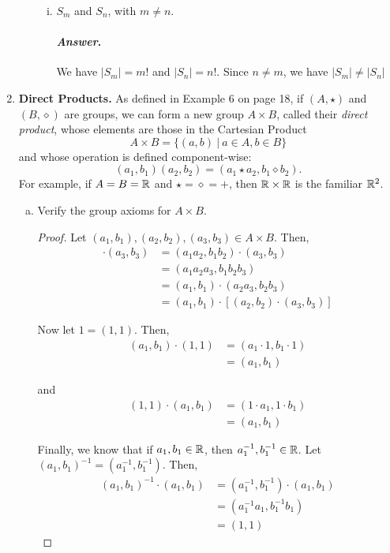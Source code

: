 \documentclass[11pt, reqno]{amsart}
\theoremstyle{plain}
\theoremstyle{definition}
\theoremstyle{example}
\newenvironment{ans}{\color{black}\medskip \paragraph*{\emph{Answer}.}}{\hfill \break  $~\!\!$ \dotfill \medskip }
\begin{document}
\begin{enumerate}[1.]
\begin{enumerate}[(a)]
\begin{enumerate}[(i)]
\item $S_m$ and $S_n$, with $m \neq n$.
\begin{ans}
We have $|S_m| = m!$ and $|S_n| = n!$. Since $n \neq m$, we have $|S_m| \neq |S_n|$
\end{ans}
\end{enumerate}

\end{enumerate}




\item {\bf Direct Products. } As defined in Example 6 on page 18, if $(A, \star)$ and $(B, \diamond)$ are groups, we can form a new group $A \times B$, called their \emph{direct product}, whose elements are those in the Cartesian Product 
$$A \times B = \{(a,b) ~|~ a \in A, b\in B\}$$
and whose operation is defined component-wise:
$$(a_1, b_1) (a_2, b_2) = (a_1 \star a_2, b_1 \diamond b_2).$$
For example, if $A = B = \mathbb{R}$ and $\star = \diamond = +$, then $\mathbb{R} \times \mathbb{R}$ is the familiar $\mathbb{R}^2$. 
\begin{enumerate}[(a)]
\item Verify the group axioms for $A \times B$. 
\begin{proof}
Let $(a_1, b_1), (a_2, b_2), (a_3, b_3) \in A \times B$. Then,
\begin{align*}
[(a_1, b_1) \cdot (a_2, b_2)] \cdot (a_3, b_3) &= (a_1a_2, b_1b_2) \cdot (a_3, b_3)\\
&= (a_1a_2a_3, b_1b_2b_3)\\
&= (a_1, b_1) \cdot (a_2a_3, b_2b_3)\\
&= (a_1, b_1) \cdot [(a_2, b_2) \cdot (a_3, b_3)]
\end{align*}

Now let $1 = (1, 1)$. Then,
\begin{align*}
(a_1, b_1) \cdot (1, 1) &= (a_1 \cdot 1, b_1 \cdot 1)\\
&= (a_1, b_1)
\end{align*}

and
\begin{align*}
(1, 1) \cdot (a_1, b_1) &= (1 \cdot a_1, 1 \cdot b_1)\\
&= (a_1, b_1)
\end{align*}

Finally, we know that if $a_1, b_1 \in \mathbb{R}$, then $a_1^{-1}, b_1^{-1} \in \mathbb{R}$. Let $(a_1, b_1)^{-1} = (a_1^{-1}, b_1^{-1})$. Then,
\begin{align*}
(a_1, b_1)^{-1} \cdot (a_1, b_1) &= (a_1^{-1}, b_1^{-1}) \cdot (a_1, b_1)\\
&= (a_1^{-1}a_1, b_1^{-1}b_1)\\
&= (1, 1)
\end{align*}


\end{proof}
\end{enumerate}
\end{enumerate}
\end{document}
